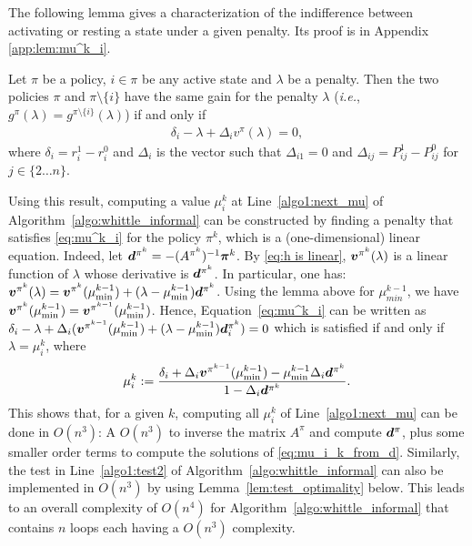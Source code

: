 \documentclass[acmsmall,screen,anonymous]{acmart}
\begin{document}
The following lemma gives a characterization of the indifference between activating or resting a state under a given penalty. Its proof is in Appendix \ref{app:lem:mu^k_i}.


\begin{lemma}
    \label{lem:mu^k_i}
    Let $\pi$ be a policy, $i\in\pi$ be any active state and $\lambda$ be a penalty. Then the two policies $\pi$ and $\pi\setminus\{i\}$ have the same gain for the penalty $\lambda$ (\emph{i.e.}, $g^\pi(\lambda)=g^{\pi\setminus\{i\}}(\lambda)$) if and only if
    \begin{align}
        \delta_i - \lambda + \Delta_i v^\pi(\lambda) = 0,\label{eq:mu^k_i}
    \end{align}
    where $\delta_i=r^1_i - r^0_i$ and $\Delta_i$ is the vector such that $\Delta_{i1}=0$ and $\Delta_{ij}=P^1_{ij}-P^0_{ij}$ for $j\in\{2\dots n\}$.
\end{lemma}



Using this result, computing a value $\mu^k_i$ at Line~\ref{algo1:next_mu} of Algorithm~\ref{algo:whittle_informal} can be constructed by finding a penalty that satisfies \eqref{eq:mu^k_i} for the policy $\pi^k$, which is a (one-dimensional) linear equation. Indeed, let $\boldsymbol{d}^{\pi^k}=-(A^{\pi^k})^{-1}\boldsymbol{\pi}^k$. By \eqref{eq:h is linear}, $\boldsymbol{v}^{\pi^k}(\lambda)$ is a linear function of $\lambda$ whose derivative is $\boldsymbol{d}^{\pi^k}$. In particular, one has: $\boldsymbol{v}^{\pi^k}(\lambda) = \boldsymbol{v}^{\pi^k}(\mu^{k-1}_{\min}) + (\lambda-\mu^{k-1}_{\min})\boldsymbol{d}^{\pi^k}$. Using the lemma above for $\mu^{k-1}_{min}$, we have ${\boldsymbol{v}^{\pi^k}(\mu^{k-1}_{\min})=\boldsymbol{v}^{\pi^{k-1}}(\mu^{k-1}_{\min})}$. Hence, Equation~\eqref{eq:mu^k_i} can be written as $\delta_i - \lambda + \Delta_i (\boldsymbol{v}^{\pi^{k-1}}(\mu^{k-1}_{\min}) + (\lambda-\mu^{k-1}_{\min})\boldsymbol{d}^{\pi^k}_i)=0$ which is satisfied if and only if $\lambda=\mu^k_i$, where 
\begin{align}
    \label{eq:mu_i_k_from_d}
    \mu^k_i := \frac{\delta_i + \Delta_i \boldsymbol{v}^{\pi^{k-1}}(\mu^{k-1}_{\min}) - \mu^{k-1}_{\min} \Delta_i\boldsymbol{d}^{\pi^k}}{1-\Delta_i \boldsymbol{d}^{\pi^k}}.
\end{align}
This shows that, for a given $k$, computing all $\mu^k_i$ of Line~\ref{algo1:next_mu} can be done in $O(n^3)$: A $O(n^3)$ to inverse the matrix $A^{\pi}$ and compute $\boldsymbol{d}^\pi$, plus some smaller order terms to compute the solutions of \eqref{eq:mu_i_k_from_d}. Similarly, the test in Line~\ref{algo1:test2} of Algorithm~\ref{algo:whittle_informal} can also be implemented in $O(n^3)$ by using Lemma~\ref{lem:test_optimality} below. This leads to an overall complexity of $O(n^4)$ for Algorithm~\ref{algo:whittle_informal} that contains $n$ loops each having a $O(n^3)$ complexity.
\end{document}
